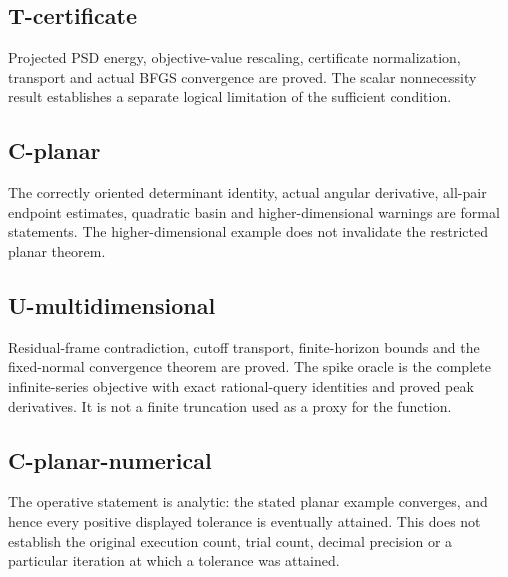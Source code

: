\subsection{T-certificate}\label{t-certificate}

Projected PSD energy, objective-value rescaling, certificate normalization, transport and actual BFGS convergence are proved. The scalar nonnecessity result establishes a separate logical limitation of the sufficient condition.



\subsection{C-planar}\label{c-planar}

The correctly oriented determinant identity, actual angular derivative, all-pair endpoint estimates, quadratic basin and higher-dimensional warnings are formal statements. The higher-dimensional example does not invalidate the restricted planar theorem.



\subsection{U-multidimensional}\label{u-multidimensional}

Residual-frame contradiction, cutoff transport, finite-horizon bounds and the fixed-normal convergence theorem are proved. The spike oracle is the complete infinite-series objective with exact rational-query identities and proved peak derivatives. It is not a finite truncation used as a proxy for the function.



\subsection{C-planar-numerical}\label{c-planar-numerical}

The operative statement is analytic: the stated planar example converges, and hence every positive displayed tolerance is eventually attained. This does not establish the original execution count, trial count, decimal precision or a particular iteration at which a tolerance was attained.



